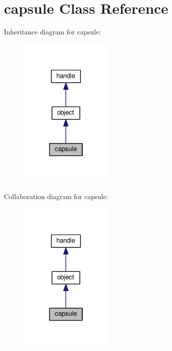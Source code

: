 \hypertarget{classcapsule}{}\section{capsule Class Reference}
\label{classcapsule}


Inheritance diagram for capsule\+:
\nopagebreak
\begin{figure}[H]
\begin{center}
\leavevmode
\includegraphics[width=130pt]{classcapsule__inherit__graph}
\end{center}
\end{figure}


Collaboration diagram for capsule\+:
\nopagebreak
\begin{figure}[H]
\begin{center}
\leavevmode
\includegraphics[width=130pt]{classcapsule__coll__graph}
\end{center}
\end{figure}
